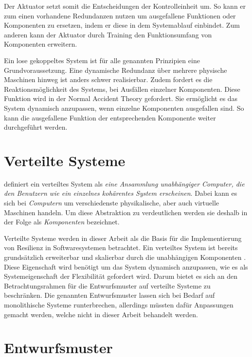 \documentclass[]{lni}
\begin{document}
Der Aktuator setzt somit die Entscheidungen der Kontrolleinheit um.
So kann er zum einen vorhandene Redundanzen nutzen um ausgefallene Funktionen oder Komponenten zu ersetzen, indem er diese in dem Systemablauf einbindet.
Zum anderen kann der Aktuator durch Training den Funktionsumfang von Komponenten erweitern.

\vspace{.5cm}
Ein lose gekoppeltes System ist für alle genannten Prinzipien eine Grundvoraussetzung.
Eine dynamische Redundanz über mehrere physische Maschinen hinweg ist anders schwer realisierbar.
Zudem fordert es die Reaktionsmöglichkeit des Systems, bei Ausfällen einzelner Komponenten.
Diese Funktion wird in der Normal Accident Theory gefordert.
Sie ermöglicht es das System dynamisch anzupassen, wenn einzelne Komponenten ausgefallen sind.
So kann die ausgefallene Funktion der entsprechenden Komponente weiter durchgeführt werden.


\section*{Verteilte Systeme} \label{design-distibutedSystems}

\cite[19]{Tanenbaum.2008} definiert ein verteiltes System als
\emph{eine Ansammlung unabhängiger Computer, die den Benutzern wie ein einzelnes kohärentes System erscheinen}.
Dabei kann es sich bei \emph{Computern} um verschiedenste physikalische, aber auch virtuelle Maschinen handeln.
Um diese Abstraktion zu verdeutlichen werden sie deshalb in der Folge als \emph{Komponenten} bezeichnet.

Verteilte Systeme werden in dieser Arbeit als die Basis für die Implementierung von Resilienz in Softwaresystemen betrachtet.
Ein verteiltes System ist bereits grundsätzlich erweiterbar und skalierbar durch die unabhängigen Komponenten \cite[19]{Tanenbaum.2008}.
Diese Eigenschaft wird benötigt um das System dynamisch anzupassen, wie es als Systemeigenschaft der Flexibilität gefordert wird.
Darum bietet es sich an den Betrachtungsrahmen für die Entwurfsmuster auf verteilte Systeme zu beschränken.
Die genannten Entwurfsmuster lassen sich bei Bedarf auf monolithische Systeme runterbrechen, allerdings müssten dafür Anpassungen gemacht werden, welche nicht in dieser Arbeit behandelt werden.


\section*{Entwurfsmuster} \label{design-practices}
\end{document}
